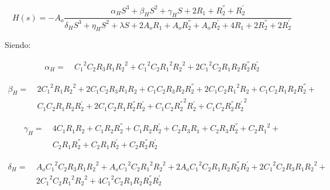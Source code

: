 \documentclass[a4paper]{article}
\begin{document}
\begin{equation}
	H(s) = -A_{o} \frac{ \alpha_H S^{3} + \beta_H S^{2} + \gamma_H S + 2 R_{1} + R_{2}^{''} + R_{2}^{'}}
	{\delta_H S^{3} + \eta_H S^{2} + \lambda S + 2 A_{o} R_{1} + A_{o} R_{2}^{''} + A_{o} R_{2}^{'} + 4 R_{1} + 2 R_{2}^{''} + 2 R_{2}^{'}}
\end{equation}

Siendo:

\begin{equation*}
\begin{split}
	\alpha_H =\ & {C_{1}}^{2} C_{2} R_{3} R_{1} {R_{2}}^{2} + {C_{1}}^{2} C_{2} {R_{1}}^{2} {R_{2}}^{2} + 2 {C_{1}}^{2} C_{2} R_{1} R_{2} R_{2}^{''} R_{2}^{'}
\end{split}
\end{equation*}

\begin{equation*}
\begin{split}
	\beta_H =\ & 2 {C_{1}}^{2} R_{1} {R_{2}}^{2} + 2 C_{1} C_{2} R_{3} R_{1} R_{2} + C_{1} C_{2} R_{3} R_{2} R_{2}^{''} + 2 C_{1} C_{2} {R_{1}}^{2} R_{2} + C_{1} C_{2} R_{1} R_{2} R_{2}^{''} +\\
	&C_{1} C_{2} R_{1} R_{2} R_{2}^{'} + 2 C_{1} C_{2} R_{1} R_{2}^{''} R_{2}^{'} + C_{1} C_{2} {R_{2}^{''}}^{2} R_{2}^{'} + C_{1} C_{2} R_{2}^{''} {R_{2}^{'}}^{2}
\end{split}
\end{equation*}

\begin{equation*}
\begin{split}
	\gamma_H =\ & 4 C_{1} R_{1} R_{2} + C_{1} R_{2} R_{2}^{''} + C_{1} R_{2} R_{2}^{'} + C_{2} R_{3} R_{1} + C_{2} R_{3} R_{2}^{''} + C_{2} {R_{1}}^{2} +\\
	&C_{2} R_{1} R_{2}^{''} + C_{2} R_{1} R_{2}^{'} + C_{2} R_{2}^{''} R_{2}^{'}
\end{split}
\end{equation*}

\begin{equation*}
\begin{split}
 \delta_H =\ & A_{o} {C_{1}}^{2} C_{2} R_{3} R_{1} {R_{2}}^{2} + A_{o} {C_{1}}^{2} C_{2} {R_{1}}^{2} {R_{2}}^{2} + 2 A_{o} {C_{1}}^{2} C_{2} R_{1} R_{2} R_{2}^{''} R_{2}^{'} + 2 {C_{1}}^{2} C_{2} R_{3} R_{1} {R_{2}}^{2} +\\
 &2 {C_{1}}^{2} C_{2} {R_{1}}^{2} {R_{2}}^{2} + 4 {C_{1}}^{2} C_{2} R_{1} R_{2} R_{2}^{''} R_{2}^{'}
\end{split}
\end{equation*}
\end{document}

